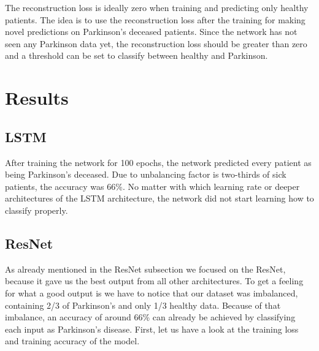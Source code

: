 \documentclass[journal]{IEEEtran}
\begin{document}
The reconstruction loss is ideally zero when training and predicting only healthy patients. The idea is to use the reconstruction loss after the training for making novel predictions on Parkinson's deceased patients. Since the network has not seen any Parkinson data yet, the reconstruction loss should be greater than zero and a threshold can be set to classify between healthy and Parkinson.
%
%
\section{Results} 
\subsection{LSTM}
After training the network for 100 epochs, the network predicted every patient as being Parkinson's deceased. Due to unbalancing factor is two-thirds of sick patients, the accuracy was 66\%. No matter with which learning rate or deeper architectures of the LSTM architecture, the network did not start learning how to classify properly. 

\subsection{ResNet}
As already mentioned in the ResNet subsection we focused on the ResNet, because it gave us the best output from all other architectures. To get a feeling for what a good output is we have to notice that our dataset was imbalanced, containing 2/3 of Parkinson's and only 1/3 healthy data. Because of that imbalance, an accuracy of around 66\% can already be achieved by classifying each input as Parkinson's disease. First, let us have a look at the training loss and training accuracy of the model.\\
\end{document}
